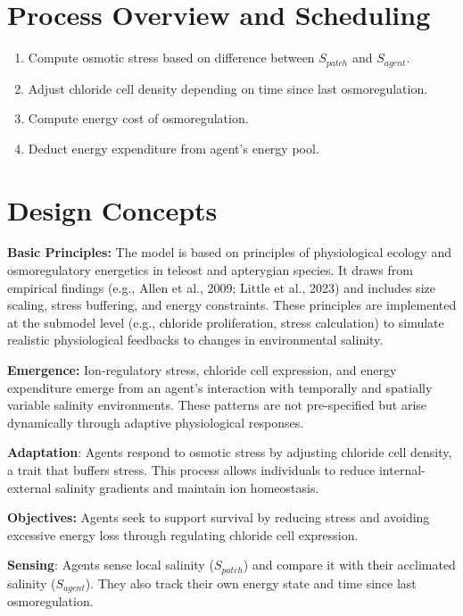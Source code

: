 \documentclass[
]{book}
\begin{document}
\section{Process Overview and Scheduling}\label{process-overview-and-scheduling}

\begin{enumerate}
\def\labelenumi{\arabic{enumi}.}
\item
  Compute osmotic stress based on difference between \(S_{patch}\) and \(S_{agent}\).
\item
  Adjust chloride cell density depending on time since last osmoregulation.
\item
  Compute energy cost of osmoregulation.
\item
  Deduct energy expenditure from agent's energy pool.
\end{enumerate}

\section{Design Concepts}\label{design-concepts}

\textbf{Basic Principles:} The model is based on principles of physiological ecology and osmoregulatory energetics in teleost and apterygian species.
It draws from empirical findings (e.g., Allen et al., 2009; Little et al., 2023) and includes size scaling, stress buffering, and energy constraints.
These principles are implemented at the submodel level (e.g., chloride proliferation, stress calculation) to simulate realistic physiological feedbacks to changes in environmental salinity.

\textbf{Emergence:} Ion-regulatory stress, chloride cell expression, and energy expenditure emerge from an agent's interaction with temporally and spatially variable salinity environments.
These patterns are not pre-specified but arise dynamically through adaptive physiological responses.

\textbf{Adaptation}: Agents respond to osmotic stress by adjusting chloride cell density, a trait that buffers stress.
This process allows individuals to reduce internal-external salinity gradients and maintain ion homeostasis.

\textbf{Objectives:} Agents seek to support survival by reducing stress and avoiding excessive energy loss through regulating chloride cell expression.

\textbf{Sensing}: Agents sense local salinity (\(S_{patch}\)) and compare it with their acclimated salinity (\(S_{agent}\)).
They also track their own energy state and time since last osmoregulation.
\end{document}
